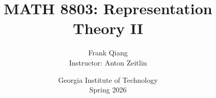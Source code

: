 \documentclass[12pt, letterpaper, oneside]{book}
\title{MATH 8803: Representation Theory II}
\author{Frank Qiang\\Instructor: Anton Zeitlin}
\date{Georgia Institute of Technology\\Spring 2026}
\theoremstyle{definition}
\begin{document}
  \maketitle

  \begingroup
  \let\cleardoublepage\clearpage
  \tableofcontents
  \endgroup

  
  
  
  
  
  
  
  
  
  
  
  
  
  
  
  
  
  
  
  
  
  
  
  
  
  
  
  
\end{document}
